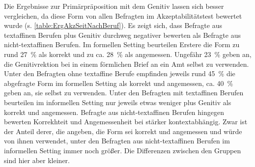 Die Ergebnisse zur Primärpräposition  mit dem Genitiv lassen sich besser vergleichen, da diese Form von allen Befragten im Akzeptabilitätstest bewertet wurde (s. \autoref{table:ErgAkzSeitNachBeruf}). 
Es zeigt sich, dass Befragte aus textaffinen Berufen  plus Genitiv durchweg negativer bewerten als Befragte aus nicht-textaffinen Berufen. 
Im formellen Setting beurteilen Erstere die Form zu rund 27~\% als korrekt und zu ca. 28~\% als angemessen. 
Ungefähr 23~\% geben an, die Genitivrektion bei  in einem förmlichen Brief an ein Amt selbst zu verwenden. 
Unter den Befragten ohne textaffine Berufe empfinden jeweils rund 45~\% die abgefragte Form im formellen Setting als korrekt und angemessen, ca. 40~\% geben an, sie selbst zu verwenden. 
Unter den Befragten mit textaffinen Berufen beurteilen im informellen Setting nur jeweils etwas weniger  plus Genitiv als korrekt und angemessen. 
Befragte aus nicht-textaffinen Berufen hingegen bewerten Korrekhteit und Angemessenheit bei  stärker kontextabhängig. 
Zwar ist der Anteil derer, die angeben, die Form sei korrekt und angemessen und würde von ihnen verwendet, unter den Befragten aus nicht-textaffinen Berufen im informellen Setting immer noch größer. 
Die Differenzen zwischen den Gruppen sind hier aber kleiner.

